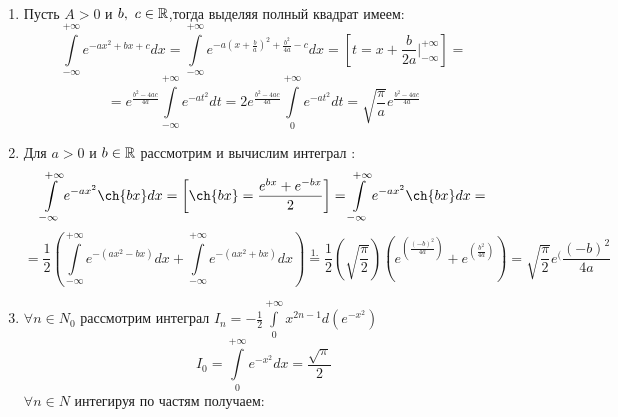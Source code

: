 \documentclass[../../main.tex]{subfiles}
\begin{document}
\begin{examples}
~
 \begin{enumerate}
  \item Пусть  $A>0$ и $b,\ c \in \mathbb{R}$,тогда выделяя полный квадрат имеем:
  \[
   \int\limits_{-\infty}^{+\infty}e^{-ax^2 + bx + c}dx =
   \int\limits_{-\infty}^{+\infty}e^{-a(x + \frac{b}{a})^2 +
   \frac{b^2}{4a} - c}dx =
   \left[t = x + \frac{b}{2a}\vert_{-\infty}^{+\infty} \right] =
  \]
  \[
   = e^{\frac{b^2-4ac}{4a}} \int\limits_{-\infty}^{+\infty}e^{-at^2}dt =
   2e^{\frac{b^2-4ac}{4a}} \int\limits_0^{+\infty}e^{-at^2}dt=
   \sqrt{\frac{\pi}{a}}e^{\frac{b^2-4ac}{4a}}
  \]

  \item Для $a>0$ и $b \in \mathbb{R}$ рассмотрим и вычислим интеграл :
  \[
    \int\limits_{-\infty}^{+\infty}e^{-ax^2}\ch{bx}dx =
    \left[\ch{bx} = \frac{e^{bx} + e^{-bx}}{2} \right] = 
    \int\limits_{-\infty}^{+\infty}e^{-ax^2}\ch{bx}dx =
  \]
  \[
    =\frac{1}{2}(\int\limits_{-\infty}^{+\infty}e^{-(ax^2 - bx)}dx  +
    \int\limits_{-\infty}^{+\infty}e^{-(ax^2 + bx)}dx)
    \overset{1.}{=} \frac{1}{2}(\sqrt{\frac{\pi}{2}})
    (e^(\frac{(-b)^2}{4a}) + e^(\frac{b^2}{4a})) =
    \sqrt{\frac{\pi}{2}}e^(\frac{(-b)^2}{4a}
  \]
  \item $\forall n \in N_0$ рассмотрим интеграл 
  $I_n = -\frac{1}{2} \int\limits_{0}^{+\infty}x^{2n-1}d{(e^{-x^2})}$
  \[
   I_0 = \int\limits_0^{+\infty}e^{-x^2}dx = \frac{\sqrt{\pi}}{2}
  \]
  $\forall n \in N$ интегируя по частям получаем:
  

\end{enumerate}
\end{examples}
\end{document}
